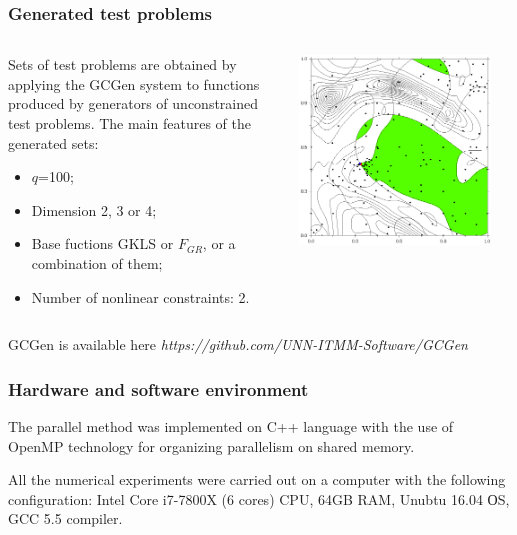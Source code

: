 \documentclass[aspectratio=1610]{beamer}
\begin{document}
\begin{frame}
  \frametitle{Generated test problems}
  \begin{columns}
    \begin{column}{0.5\textwidth}
      Sets of test problems are obtained by applying the GCGen system to
      functions produced by generators of unconstrained test problems.
      The main features of the generated sets:
      \begin{itemize}
        \item \(q\)=100;
        \item Dimension 2, 3 or 4;
        \item Base fuctions GKLS or \(F_{GR}\), or a combination of them;
        \item Number of nonlinear constraints: 2.
      \end{itemize}
    \end{column}
    \begin{column}{0.5\textwidth}
      \centerline{\includegraphics[width=0.9\textwidth]{4.png}}
    \end{column}
  \end{columns}
  \footnotesize{GCGen is available here \textit{https://github.com/UNN-ITMM-Software/GCGen}}
\end{frame}

\begin{frame}
  \frametitle{Hardware and software environment}
  \begin{center}
    The parallel method was implemented on C++ language with the use of OpenMP
    technology for organizing parallelism on shared memory.

    All the numerical experiments were carried out on a computer with the following
    configuration: Intel Core i7-7800X (6 cores) CPU, 64GB RAM, Unubtu 16.04 ОS, GCC 5.5 compiler.
  \end{center}
\end{frame}
\end{document}
